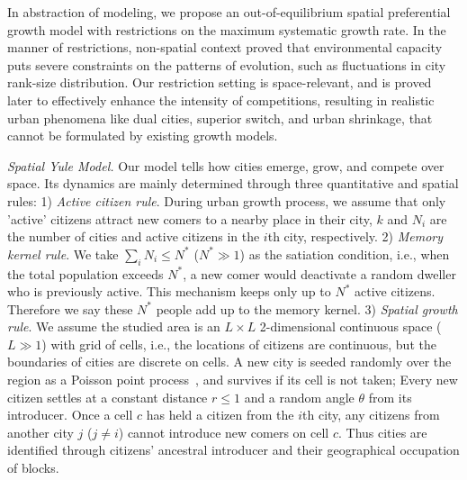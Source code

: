 \documentclass[reprint,unsortedaddress,amsmath,amssymb,aps,prl,showkeys]{revtex4-2}
\begin{document}
In abstraction of modeling, we propose an out-of-equilibrium spatial preferential growth model with restrictions on the maximum systematic growth rate. In the manner of restrictions, non-spatial context\cite{PhysRevE.55.R3817} proved that environmental capacity puts severe constraints on the patterns of evolution, such as fluctuations in city rank-size distribution. Our restriction setting is space-relevant, and is proved later to effectively enhance the intensity of competitions, resulting in realistic urban phenomena like dual cities\cite{silverman2018rethinking}, superior switch\cite{gabaix2004evolution}, and urban shrinkage\cite{haase2014conceptualizing}, that cannot be formulated by existing growth models. 

\textit{Spatial Yule Model.} Our model tells how cities emerge, grow, and compete over space. Its dynamics are mainly determined through three quantitative and spatial rules: 1) \textit{Active citizen rule}. During urban growth process, we assume that only 'active' citizens attract new comers to a nearby place in their city, $k$ and $N_i$ are the number of cities and active citizens in the $i$th city, respectively. 2) \textit{Memory kernel rule}. We take $\sum_{i} N_i \le N^*$ ($N^* \gg 1$) as the satiation condition, i.e., when the total population exceeds $N^*$, a new comer would deactivate a random dweller who is previously active. This mechanism keeps only up to $N^*$ active citizens. Therefore we say these $N^*$ people add up to the memory kernel. 3) \emph{Spatial growth rule}. We assume the studied area is an $L\times L$ 2-dimensional continuous space ($L\gg 1$) with grid of cells, %
i.e., the locations of citizens are continuous, but the boundaries of cities are discrete on cells. A new city is seeded randomly over the region as a Poisson point process~\cite{miles1970homogeneous}, and survives if its cell is not taken; Every new citizen settles at a constant distance $r\le 1$ and a random angle $\theta$ from its introducer. Once a cell $c$ has held a citizen from the $i$th city, any citizens from another city $j$ ($j\ne i$) cannot introduce new comers on cell $c$. Thus cities are identified through citizens' ancestral introducer and their geographical occupation of blocks.
\end{document}
